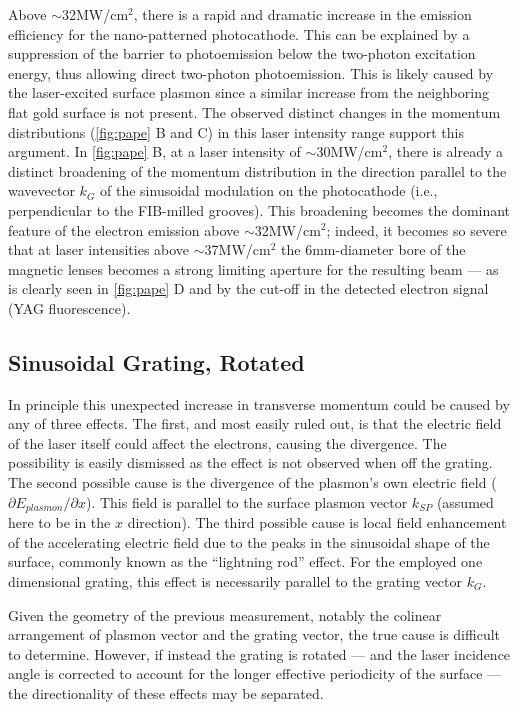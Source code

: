 Above $\sim$32MW/cm$^2$, there is a rapid and dramatic increase in the emission efficiency for the nano-patterned photocathode.
This can be explained by a suppression of the barrier to photoemission below the two-photon excitation energy, thus allowing direct two-photon photoemission.
This is likely caused by the laser-excited surface plasmon since a similar increase from the neighboring flat gold surface is not present.
The observed distinct changes in the momentum distributions (\ref{fig:pape} B and C) in this laser intensity range support this argument.
In \ref{fig:pape} B, at a laser intensity of $\sim$30MW/cm$^2$, there is already a distinct broadening of the momentum distribution in the direction parallel to the wavevector $k_G$ of the sinusoidal modulation on the photocathode (i.e., perpendicular to the FIB-milled grooves). 
This broadening becomes the dominant feature of the electron emission above $\sim$32MW/cm$^2$; indeed, it becomes so severe that at laser intensities above $\sim$37MW/cm$^2$ the 6mm-diameter bore of the magnetic lenses becomes a strong limiting aperture for the resulting beam --- as is clearly seen in \ref{fig:pape} D and by the cut-off in the detected electron signal (YAG fluorescence).

\subsection{Sinusoidal Grating, Rotated}

In principle this unexpected increase in transverse momentum could be caused by any of three effects.
The first, and most easily ruled out, is that the electric field of the laser itself could affect the electrons, causing the divergence.
The possibility is easily dismissed as the effect is not observed when off the grating.
The second possible cause is the divergence of the plasmon's own electric field ($\partial E_{plasmon} / \partial x$).
This field is parallel to the surface plasmon vector $k_{SP}$ (assumed here to be in the $x$ direction).
The third possible cause is local field enhancement of the accelerating electric field due to the peaks in the sinusoidal shape of the surface, commonly known as the ``lightning rod'' effect.
For the employed one dimensional grating, this effect is necessarily parallel to the grating vector $k_G$.

Given the geometry of the previous measurement, notably the colinear arrangement of plasmon vector and the grating vector, the true cause is difficult to determine.
However, if instead the grating is rotated --- and the laser incidence angle is corrected to account for the longer effective periodicity of the surface --- the directionality of these effects may be separated.

